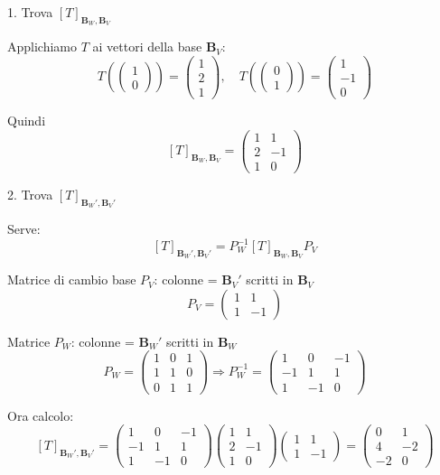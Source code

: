 \documentclass[12pt,a4paper]{article}
\begin{document}
1. Trova \( [T]_{\bm{B}_W, \bm{B}_V} \)

Applichiamo \( T \) ai vettori della base \( \bm{B}_V \):
\[
T\left( \begin{pmatrix} 1 \\ 0 \end{pmatrix} \right) = \begin{pmatrix} 1 \\ 2 \\ 1 \end{pmatrix}, \quad
T\left( \begin{pmatrix} 0 \\ 1 \end{pmatrix} \right) = \begin{pmatrix} 1 \\ -1 \\ 0 \end{pmatrix}
\]

Quindi
\[
[T]_{\bm{B}_W, \bm{B}_V} =
\begin{pmatrix}
1 & 1 \\
2 & -1 \\
1 & 0
\end{pmatrix}
\]

2. Trova \( [T]_{\bm{B}_W', \bm{B}_V'} \)

Serve:
\[
[T]_{\bm{B}_W', \bm{B}_V'} = P_W^{-1} [T]_{\bm{B}_W, \bm{B}_V} P_V
\]

Matrice di cambio base \( P_V \): colonne = \( \bm{B}_V' \) scritti in \( \bm{B}_V \)
\[
P_V = \begin{pmatrix}
1 & 1 \\
1 & -1
\end{pmatrix}
\]

Matrice \( P_W \): colonne = \( \bm{B}_W' \) scritti in \( \bm{B}_W \)
\[
P_W =
\begin{pmatrix}
1 & 0 & 1 \\
1 & 1 & 0 \\
0 & 1 & 1
\end{pmatrix}
\Rightarrow
P_W^{-1} = 
\begin{pmatrix}
1 & 0 & -1 \\
-1 & 1 & 1 \\
1 & -1 & 0
\end{pmatrix}
\]

Ora calcolo:
\[
[T]_{\bm{B}_W', \bm{B}_V'} =
\begin{pmatrix}
1 & 0 & -1 \\
-1 & 1 & 1 \\
1 & -1 & 0
\end{pmatrix}
\begin{pmatrix}
1 & 1 \\
2 & -1 \\
1 & 0
\end{pmatrix}
\begin{pmatrix}
1 & 1 \\
1 & -1
\end{pmatrix}
=
\boxed{
\begin{pmatrix}
0 & 1 \\
4 & -2 \\
-2 & 0
\end{pmatrix}
}
\]
\end{document}
